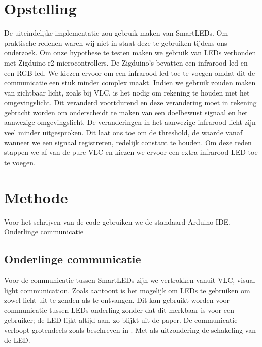 \documentclass{article}
\begin{document}
\section{Opstelling}
De uiteindelijke implementatie zou gebruik maken van SmartLEDs. Om praktische redenen waren wij niet in staat deze te gebruiken tijdens ons onderzoek. 
Om onze hypothese te testen maken we gebruik van LEDs verbonden met Zigduino r2 microcontrollers. De Zigduino’s bevatten een infrarood led en een RGB led. We kiezen ervoor om een infrarood led toe te voegen omdat dit de communicatie een stuk minder complex maakt. Indien we gebruik zouden maken van zichtbaar licht, zoals bij VLC, is het nodig om rekening te houden met het omgevingslicht. Dit veranderd voortdurend en deze verandering moet in rekening gebracht worden om onderscheidt te maken van een doelbewust signaal en het aanwezige omgevingslicht. De veranderingen in het aanwezige infrarood licht zijn veel minder uitgesproken. Dit laat ons toe om de threshold, de waarde vanaf wanneer we een signaal registreren, redelijk constant te houden. Om deze reden stappen we af van de pure VLC en kiezen we ervoor een extra infrarood LED toe te voegen.


\section{Methode}

Voor het schrijven van de code gebruiken we de standaard Arduino IDE.
Onderlinge communicatie



\subsection{Onderlinge communicatie}

Voor de communicatie tussen SmartLEDs zijn we vertrokken vanuit VLC, visual light communication. Zoals \cite{VLCNetworks} aantoont is het mogelijk om LEDs te gebruiken om zowel licht uit te zenden als te ontvangen. Dit kan gebruikt worden voor communicatie tussen LEDs onderling zonder dat dit merkbaar is voor een gebruiker; de LED lijkt altijd aan, zo blijkt uit de paper. De communicatie verloopt grotendeels zoals beschreven in \cite{smartLED}. Met als uitzondering de schakeling van de LED. 
\end{document}
